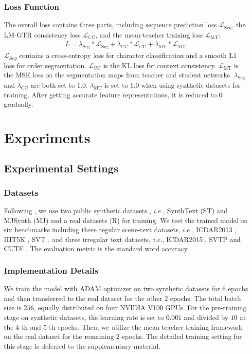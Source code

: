 \documentclass[letterpaper]{article} \usepackage{aaai22}  \usepackage{times}  \usepackage{helvet}  \usepackage{courier}  \usepackage[hyphens]{url}  \usepackage{graphicx} \urlstyle{rm} \def\UrlFont{\rm}  \usepackage{natbib}  \usepackage{caption} \DeclareCaptionStyle{ruled}{labelfont=normalfont,labelsep=colon,strut=off} \frenchspacing  \setlength{\pdfpagewidth}{8.5in}  \setlength{\pdfpageheight}{11in}
\begin{document}
\subsubsection{Loss Function}
The overall loss contains three parts, including sequence prediction loss $\mathcal{L}_{\text{Seq}}$, the LM-GTR consistency loss $\mathcal{L}_{\text {CC}}$, and the mean-teacher training loss $\mathcal{L}_{\text {MT}}$:
\begin{align} 
	L = \lambda_{\text{Seg}}*\mathcal{L}_{\text{Seg}}+\lambda_{\text{CC}}*\mathcal{L}_{\text{CC}}+\lambda_{\text{MT}}*\mathcal{L}_{\text {MT}}.
\end{align}
$\mathcal{L}_{Seg}$ contains a cross-entropy loss for character classification and a smooth L1 loss for order segmentation. $\mathcal{L}_{\text{CC}}$ is the KL loss for context consistency. $\mathcal{L}_{\text{MT}}$ is the MSE loss on the segmentation maps from teacher and student networks. $\lambda_{\text{Seg}}$ and $\lambda_{\text{CC}}$ are both set to 1.0. $\lambda_{\text{MT}}$ is set to 1.0 when using synthetic datasets for training. After getting accurate feature representations, it is reduced to $0$ gradually.


\section{Experiments}
\subsection{Experimental Settings}
\subsubsection{Datasets}
Following \cite{yu2020towards}, we use two public synthetic datasets , $i.e.$, SynthText (ST) \cite{gupta2016synthetic} and MJSynth (MJ) \cite{jaderberg2014synthetic,jaderberg2016reading} and a real datasets (R) \cite{baek2021if} for training. We test the trained model on six benchmarks including three regular scene-text datasets, $i.e.$, ICDAR2013 \cite{karatzas2013icdar}, IIIT5K \cite{mishra2012scene}, SVT \cite{wang2011end}, and three irregular text datasets, $i.e.$, ICDAR2015 \cite{karatzas2015icdar}, SVTP \cite{phan2013recognizing} and CUTE \cite{risnumawan2014robust}. The evaluation metric is the standard word accuracy.



\subsubsection{Implementation Details}
\label{subsec:arch-details}
We train the model with ADAM optimizer on two synthetic datasets for $6$ epochs and then transferred to the real dataset for the other $2$ epochs. The total batch size is $256$, equally distributed on four NVIDIA V100 GPUs. For the pre-training stage on synthetic datasets, the learning rate is set to $0.001$ and divided by $10$ at the $4$-th and $5$-th epochs. Then, we utilize the mean teacher training framework on the real dataset for the remaining $2$ epochs. The detailed training setting for this stage is deferred to the supplementary material. 
\end{document}
